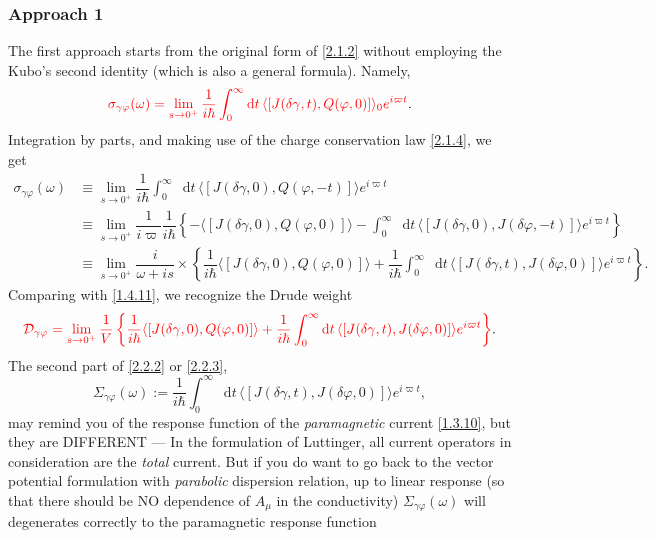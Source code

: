 \documentclass[10pt,nofootinbib,letterpaper]{revtex4}
\newcommand*\dd{\mathop{}\!\mathrm{d}}
\begin{document}
		\subsubsection{Approach 1}
		The first approach starts from the original form of \eqref{2.1.2} without employing the Kubo's second identity (which is also a general formula). Namely,
		\begin{equation}\label{2.2.1}
			{\color{red}\sigma_{\gamma\varphi}(\omega)=\lim_{s \rightarrow0^+}\dfrac{1}{i\hbar}\int_0^\infty\dd t\,\langle[J(\delta\gamma,t),Q(\varphi,0)]\rangle_0 e^{i\varpi t}}.
		\end{equation}
		Integration by parts, and making use of the charge conservation law \eqref{2.1.4}, we get
		\begin{align}
			\sigma_{\gamma\varphi}(\omega)&\equiv\lim_{s \rightarrow0^+}\dfrac{1}{i\hbar}\int_0^\infty\dd t\,\langle[J(\delta\gamma,0),Q(\varphi,-t)]\rangle e^{i\varpi t}\nonumber\\
			&\equiv\lim_{s \rightarrow0^+}\dfrac{1}{i\varpi}\dfrac{1}{i\hbar}\left\{-\langle[J(\delta\gamma,0),Q(\varphi,0)]\rangle-\int_0^\infty\dd t\,\langle[J(\delta\gamma,0),J(\delta\varphi,-t)]\rangle e^{i\varpi t}\right\}\nonumber\\
			&\equiv\lim_{s \rightarrow0^+}\dfrac{i}{\omega+is}\times\left\{\dfrac{1}{i\hbar}\langle[J(\delta\gamma,0),Q(\varphi,0)]\rangle+\dfrac{1}{i\hbar}\int_0^\infty\dd t\,\langle[J(\delta\gamma,t),J(\delta\varphi,0)]\rangle e^{i\varpi t}\right\}.\label{2.2.2}
		\end{align}
		Comparing with \eqref{1.4.11}, we recognize the Drude weight
		\begin{equation}\label{2.2.3}
			{\color{red}\mathcal{D}_{\gamma\varphi}=\lim_{s \rightarrow0^+}\dfrac{1}{V}\left\{\dfrac{1}{i\hbar}\langle[J(\delta\gamma,0),Q(\varphi,0)]\rangle+\dfrac{1}{i\hbar}\int_0^\infty\dd t\,\langle[J(\delta\gamma,t),J(\delta\varphi,0)]\rangle e^{i\varpi t}\right\}}.
		\end{equation}
		\indent The second part of \eqref{2.2.2} or \eqref{2.2.3},
		\begin{equation}\label{2.2.4}
			\Sigma_{\gamma\varphi}(\omega):=\dfrac{1}{i\hbar}\int_0^\infty\dd t\,\langle[J(\delta\gamma,t),J(\delta\varphi,0)]\rangle e^{i\varpi t},
		\end{equation}
		may remind you of the response function of the \emph{paramagnetic} current \eqref{1.3.10}, but they are DIFFERENT --- In the formulation of Luttinger, all current operators in consideration are the \emph{total} current. But if you do want to go back to the vector potential formulation with \emph{parabolic} dispersion relation, up to linear response (so that there should be NO dependence of $A_\mu$ in the conductivity) $\Sigma_{\gamma\varphi}(\omega)$ will degenerates correctly to the paramagnetic response function 
\end{document}
